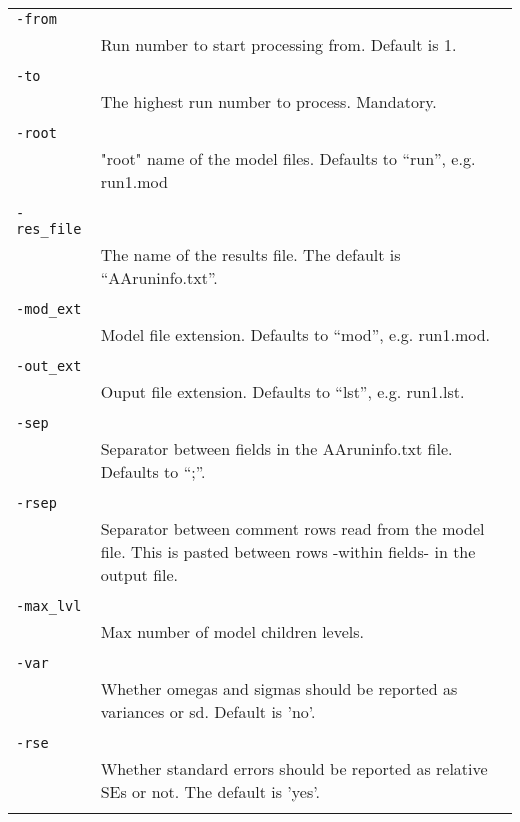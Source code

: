 \documentclass[a4paper,12pt]{article}
\begin{document}
\begin{longtable}{p{1in}p{4in}}
\verb|-from| & \\
\nopagebreak
 & Run number to start processing from. Default is 1. \\
\\
\verb|-to| & \\
\nopagebreak
 & The highest run number to process. Mandatory. \\
\\
\verb|-root| & \\
\nopagebreak
 & "root" name of the model files. Defaults to “run”, e.g. run1.mod \\
\\
\verb|-res_file| & \\
\nopagebreak
 & The name of the results file. The default is “AAruninfo.txt”. \\
\\
\verb|-mod_ext| & \\
\nopagebreak
 & Model file extension. Defaults to “mod”, e.g. run1.mod. \\
\\
\verb|-out_ext| & \\
\nopagebreak
 & Ouput file extension. Defaults to “lst”, e.g. run1.lst. \\
\\
\verb|-sep| & \\
\nopagebreak
 & Separator between fields in the AAruninfo.txt file. Defaults to “;”. \\
\\
\verb|-rsep| & \\
\nopagebreak
 & Separator between comment rows read from the model file. This is pasted between rows -within fields- in the output file. \\
\\
\verb|-max_lvl| & \\
\nopagebreak
 & Max number of model children levels. \\
\\
\verb|-var| & \\
\nopagebreak
 & Whether omegas and sigmas should be reported as variances or sd. Default is 'no'. \\
\\
\verb|-rse| & \\
\nopagebreak
 & Whether standard errors should be reported as relative SEs or not. The default is 'yes'. \\
\\
\end{longtable}
\end{document}
